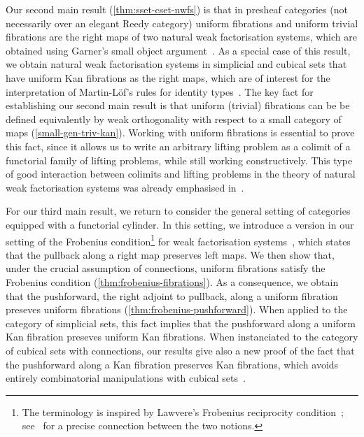 \documentclass[reqno,10pt,a4paper,oneside,draft]{amsart}
\begin{document}
Our second main result (\cref{thm:sset-cset-nwfs}) is that in presheaf categories (not necessarily over an elegant Reedy category) uniform fibrations and uniform trivial fibrations are the right maps of two natural weak factorisation systems, which are obtained using Garner's small object argument~\cite{garner:small-object-argument}.
As a special case of this result, we obtain natural weak factorisation systems in simplicial and cubical sets that have uniform Kan fibrations as the right maps, which are of interest for the interpretation of Martin-L\"of's rules for identity types~\cite{warren:thesis,awodey-warren:homotopy-idtype,garner:topological-simplicial}.
The key fact for establishing our second main result is that uniform (trivial) fibrations can be be defined equivalently by weak orthogonality with respect to a small category of maps (\cref{small-gen-triv-kan}).
Working with uniform fibrations is essential to prove this fact, since it allows us to write an arbitrary lifting problem as a colimit of a functorial family of lifting problems, while still working constructively.
This type of good interaction between colimits and lifting problems in the theory of natural weak factorisation systems was already emphasised in~\cite{riehl-cat-homotopy}.

For our third main result, we return to consider the general setting of categories equipped with a functorial cylinder.
In this setting, we introduce a version in our setting of the Frobenius condition\footnote{The terminology is inspired by Lawvere's Frobenius reciprocity condition~\cite{lawvere-equality}; see~\cite{clementino:frobenius} for a precise connection between the two notions.} for weak factorisation systems~\cite{garner:types-omega-groupoids}, which states that the pullback along a right map preserves left maps.
We then show that, under the crucial assumption of connections, uniform fibrations satisfy the Frobenius condition (\cref{thm:frobenius-fibrations}).
As a consequence, we obtain that the pushforward, \ie the right adjoint to pullback, along a uniform fibration preseves uniform fibrations (\cref{thm:frobenius-pushforward}).
When applied to the category of simplicial sets, this fact implies that the pushforward along a uniform Kan fibration preseves uniform Kan fibrations.
When instanciated to the category of cubical sets with connections, our results give also a new proof of the fact that the pushforward along a Kan fibration preserves Kan fibrations, which avoids entirely combinatorial manipulations with cubical sets~\cite{coquand-variation}.
\end{document}
